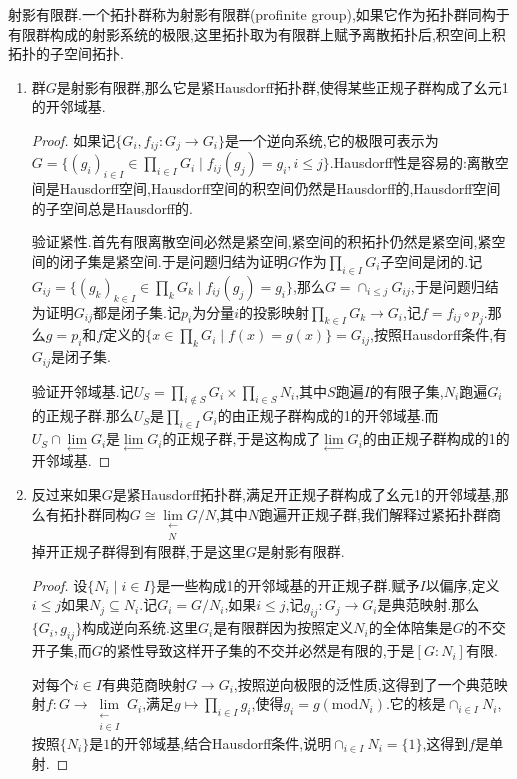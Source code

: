 射影有限群.一个拓扑群称为射影有限群(profinite group),如果它作为拓扑群同构于有限群构成的射影系统的极限,这里拓扑取为有限群上赋予离散拓扑后,积空间上积拓扑的子空间拓扑.
\begin{enumerate}
	\item 群$G$是射影有限群,那么它是紧Hausdorff拓扑群,使得某些正规子群构成了幺元1的开邻域基.
	\begin{proof}
		
		如果记$\{G_i,f_{ij}:G_j\to G_i\}$是一个逆向系统,它的极限可表示为$G=\{(g_i)_{i\in I}\in\prod_{i\in I}G_i\mid f_{ij}(g_j)=g_i,i\le j\}$.Hausdorff性是容易的:离散空间是Hausdorff空间,Hausdorff空间的积空间仍然是Hausdorff的,Hausdorff空间的子空间总是Hausdorff的.
		
		验证紧性.首先有限离散空间必然是紧空间,紧空间的积拓扑仍然是紧空间,紧空间的闭子集是紧空间.于是问题归结为证明$G$作为$\prod_{i\in I}G_i$子空间是闭的.记$G_{ij}=\{(g_k)_{k\in I}\in\prod_kG_k\mid f_{ij}(g_j)=g_i\}$,那么$G=\cap_{i\le j}G_{ij}$,于是问题归结为证明$G_{ij}$都是闭子集.记$p_i$为分量$i$的投影映射$\prod_{k\in I}G_k\to G_i$,记$f=f_{ij}\circ p_j$.那么$g=p_i$和$f$定义的$\{x\in\prod_kG_i\mid f(x)=g(x)\}=G_{ij}$,按照Hausdorff条件,有$G_{ij}$是闭子集.
		
		验证开邻域基.记$U_S=\prod_{i\not\in S}G_i\times\prod_{i\in S}N_i$,其中$S$跑遍$I$的有限子集,$N_i$跑遍$G_i$的正规子群.那么$U_S$是$\prod_{i\in I}G_i$的由正规子群构成的1的开邻域基.而$U_S\cap\lim\limits_{\leftarrow}G_i$是$\lim\limits_{\leftarrow}G_i$的正规子群,于是这构成了$\lim\limits_{\leftarrow}G_i$的由正规子群构成的1的开邻域基.
	\end{proof}
	\item 反过来如果$G$是紧Hausdorff拓扑群,满足开正规子群构成了幺元1的开邻域基,那么有拓扑群同构$G\cong\lim\limits_{\substack{\leftarrow\\N}}G/N$,其中$N$跑遍开正规子群,我们解释过紧拓扑群商掉开正规子群得到有限群,于是这里$G$是射影有限群.
	\begin{proof}
		
		设$\{N_i\mid i\in I\}$是一些构成1的开邻域基的开正规子群.赋予$I$以偏序,定义$i\le j$如果$N_j\subseteq N_i$.记$G_i=G/N_i$,如果$i\le j$,记$g_{ij}:G_j\to G_i$是典范映射.那么$\{G_i,g_{ij}\}$构成逆向系统.这里$G_i$是有限群因为按照定义$N_i$的全体陪集是$G$的不交开子集,而$G$的紧性导致这样开子集的不交并必然是有限的,于是$[G:N_i]$有限.
		
		对每个$i\in I$有典范商映射$G\to G_i$,按照逆向极限的泛性质,这得到了一个典范映射$f:G\to\lim\limits_{\substack{\leftarrow\\i\in I}}G_i$,满足$g\mapsto\prod_{i\in I}g_i$,使得$g_i=g(\mathrm{mod}N_i)$.它的核是$\cap_{i\in I}N_i$,按照$\{N_i\}$是$1$的开邻域基,结合Hausdorff条件,说明$\cap_{i\in I}N_i=\{1\}$,这得到$f$是单射.
		

\end{proof}
\end{enumerate}
